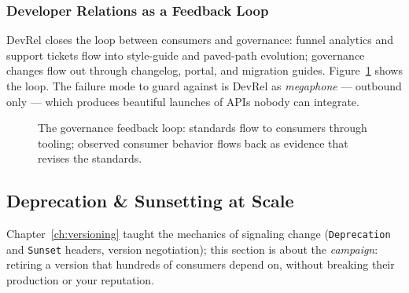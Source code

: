 \subsubsection{Developer Relations as a Feedback Loop}
DevRel closes the loop between consumers and governance: funnel analytics
and support tickets flow into style-guide and paved-path evolution;
governance changes flow out through changelog, portal, and migration
guides. Figure~\ref{fig:ch20-loop} shows the loop. The failure mode to
guard against is DevRel as \emph{megaphone} --- outbound only --- which
produces beautiful launches of APIs nobody can integrate.

\begin{figure}[htbp]
\centering
{}
\caption{The governance feedback loop: standards flow to consumers through
tooling; observed consumer behavior flows back as evidence that revises
the standards.}
\label{fig:ch20-loop}
\end{figure}

\subsection{Deprecation \& Sunsetting at Scale}
\label{sec:ch20-deprecation}

Chapter~\ref{ch:versioning} taught the mechanics of signaling change
(\texttt{Deprecation} and \texttt{Sunset} headers, version negotiation);
this section is about the \emph{campaign}: retiring a version that
hundreds of consumers depend on, without breaking their production or
your reputation.

